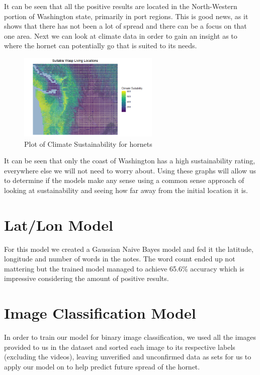 \documentclass[letterpaper]{article}
\begin{document}
It can be seen that all the positive results are located in the North-Western portion of Washington state, primarily in port regions. This is good news, as it shows that there has not been a lot of spread and there can be a focus on that one area. Next we can look at climate data in order to gain an insight as to where the hornet can potentially go that is suited to its needs.

\begin{figure}[H]
    \centering
    \includegraphics[width=0.6\textwidth]{images/weather.png}
    \caption{Plot of Climate Sustainability for hornets}
\end{figure}

It can be seen that only the coast of Washington has a high sustainability rating, everywhere else we will not need to worry about. Using these graphs will allow us to determine if the models make any sense using a common sense approach of looking at sustainability and seeing how far away from the initial location it is.

\section{Lat/Lon Model}

For this model we created a Gaussian Naive Bayes model and fed it the latitude, longitude and number of words in the notes. The word count ended up not mattering but the trained model managed to achieve 65.6\% accuracy which is impressive considering the amount of positive results.

\section{Image Classification Model}
In order to train our model for binary image classification, we used all the images provided to us in the dataset and sorted each image to its respective labels (excluding the videos), leaving unverified and unconfirmed data as sets for us to apply our model on to help predict future spread of the hornet. 
\end{document}
